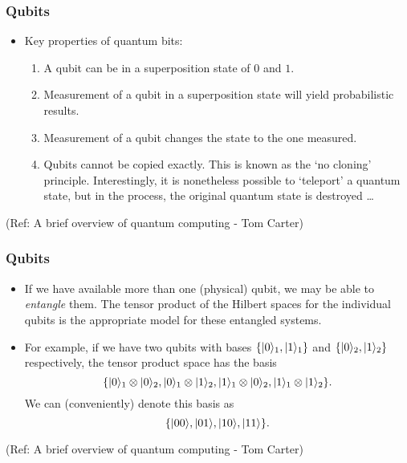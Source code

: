  \begin{frame}[fragile]\frametitle{Qubits}

\begin{itemize}

\item Key properties of quantum bits:
 \begin{enumerate}
 \item A qubit can be in a superposition state of $0$ and $1$.  
 \item Measurement of a qubit in a superposition state will yield
 probabilistic results.
 \item Measurement of a qubit changes the state to the one measured.
 \item Qubits cannot be copied exactly.  This is known as the `no cloning' principle.  Interestingly, it is nonetheless possible to `teleport' a quantum state, but in the process, the original quantum state is destroyed \ldots
 \end{enumerate}

\end{itemize}

\tiny{(Ref: A brief overview of quantum computing - Tom Carter)}

\end{frame}

 \begin{frame}[fragile]\frametitle{Qubits}

\begin{itemize}
	\item If we have available more than one (physical) qubit, we may be able to {\em entangle} them.  The tensor product of the Hilbert spaces for the individual qubits is the appropriate model for these entangled systems.

	\item For example, if we have two qubits with bases $\{|{0}\rangle_1,|{1}\rangle_1\}$ and
	$\{ |{0}\rangle_2,|{1}\rangle_2\}$ respectively, the tensor product space has the basis 
	$$\{|{0}\rangle_1\otimes|{0}\rangle_2,|{0}\rangle_1\otimes|{1}\rangle_2,|{1}\rangle_1\otimes|{0}\rangle_2,|{1}\rangle_1\otimes|{1}\rangle_2\}.$$  We can (conveniently) denote this basis as
$$\{|{00}\rangle,|{01}\rangle,|{10}\rangle,|{11}\rangle\}.$$
\end{itemize}

\tiny{(Ref: A brief overview of quantum computing - Tom Carter)}

\end{frame}


